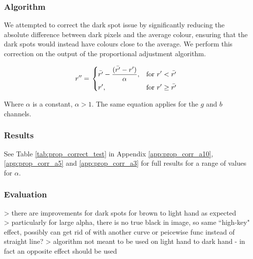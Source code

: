 \subsubsection*{Algorithm}
We attempted to correct the dark spot issue by significantly reducing the absolute difference between dark pixels and the average colour, ensuring that the dark spots would instead have colours close to the average. We perform this correction on the output of the proportional adjustment algorithm.

\begin{equation} \label{eq:prop_corr_algo}
  r'' = \left.
  \begin{dcases}
    \displaystyle \bar{r'} - \frac{(\bar{r'} - r')}{\alpha}, & \text{for } r' < \bar{r'} \\
    \displaystyle r', & \text{for } r' \geq \bar{r'} \\
  \end{dcases}
  \right.\\
\end{equation}

Where $\alpha$ is a constant, $\alpha  > 1$. The same equation applies for the $g$ and $b$ channels.

\subsubsection*{Results}
See Table \ref{tab:prop_correct_test} in Appendix \ref{app:prop_corr_a10}, \ref{app:prop_corr_a5} and \ref{app:prop_corr_a3} for full results for a range of values for $\alpha$. %

\subsubsection*{Evaluation}
> there are improvements for dark spots for brown to light hand as expected\\
> particularly for large alpha, there is no true black in image, so same ``high-key" effect, possibly can get rid of with another curve or peicewise func instead of straight line?
> algorithm not meant to be used on light hand to dark hand - in fact an opposite effect should be used